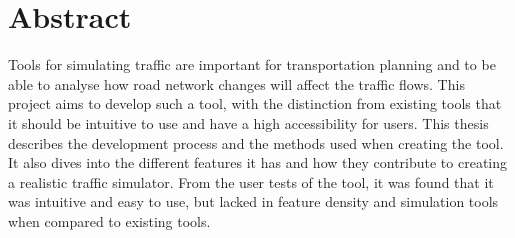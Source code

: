 


\thispagestyle{plain} 
\setlength{\parskip}{0pt plus 1.0pt}
\section*{Abstract}
    Tools for simulating traffic are important for transportation planning and to be able to analyse how road network changes will affect the traffic flows. This project aims to develop such a tool, with the distinction from existing tools that it should be intuitive to use and have a high accessibility for users. This thesis describes the development process and the methods used when creating the tool. It also dives into the different features it has and how they contribute to creating a realistic traffic simulator. From the user tests of the tool, it was found that it was intuitive and easy to use, but lacked in feature density and simulation tools when compared to existing tools.


